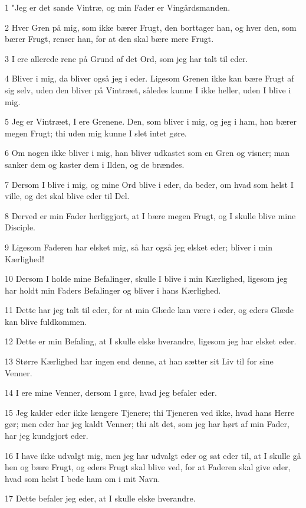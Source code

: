 \par 1 "Jeg er det sande Vintræ, og min Fader er Vingårdsmanden.
\par 2 Hver Gren på mig, som ikke bærer Frugt, den borttager han, og hver den, som bærer Frugt, renser han, for at den skal bære mere Frugt.
\par 3 I ere allerede rene på Grund af det Ord, som jeg har talt til eder.
\par 4 Bliver i mig, da bliver også jeg i eder. Ligesom Grenen ikke kan bære Frugt af sig selv, uden den bliver på Vintræet, således kunne I ikke heller, uden I blive i mig.
\par 5 Jeg er Vintræet, I ere Grenene. Den, som bliver i mig, og jeg i ham, han bærer megen Frugt; thi uden mig kunne I slet intet gøre.
\par 6 Om nogen ikke bliver i mig, han bliver udkastet som en Gren og visner; man sanker dem og kaster dem i Ilden, og de brændes.
\par 7 Dersom I blive i mig, og mine Ord blive i eder, da beder, om hvad som helst I ville, og det skal blive eder til Del.
\par 8 Derved er min Fader herliggjort, at I bære megen Frugt, og I skulle blive mine Disciple.
\par 9 Ligesom Faderen har elsket mig, så har også jeg elsket eder; bliver i min Kærlighed!
\par 10 Dersom I holde mine Befalinger, skulle I blive i min Kærlighed, ligesom jeg har holdt min Faders Befalinger og bliver i hans Kærlighed.
\par 11 Dette har jeg talt til eder, for at min Glæde kan være i eder, og eders Glæde kan blive fuldkommen.
\par 12 Dette er min Befaling, at I skulle elske hverandre, ligesom jeg har elsket eder.
\par 13 Større Kærlighed har ingen end denne, at han sætter sit Liv til for sine Venner.
\par 14 I ere mine Venner, dersom I gøre, hvad jeg befaler eder.
\par 15 Jeg kalder eder ikke længere Tjenere; thi Tjeneren ved ikke, hvad hans Herre gør; men eder har jeg kaldt Venner; thi alt det, som jeg har hørt af min Fader, har jeg kundgjort eder.
\par 16 I have ikke udvalgt mig, men jeg har udvalgt eder og sat eder til, at I skulle gå hen og bære Frugt, og eders Frugt skal blive ved, for at Faderen skal give eder, hvad som helst I bede ham om i mit Navn.
\par 17 Dette befaler jeg eder, at I skulle elske hverandre.
